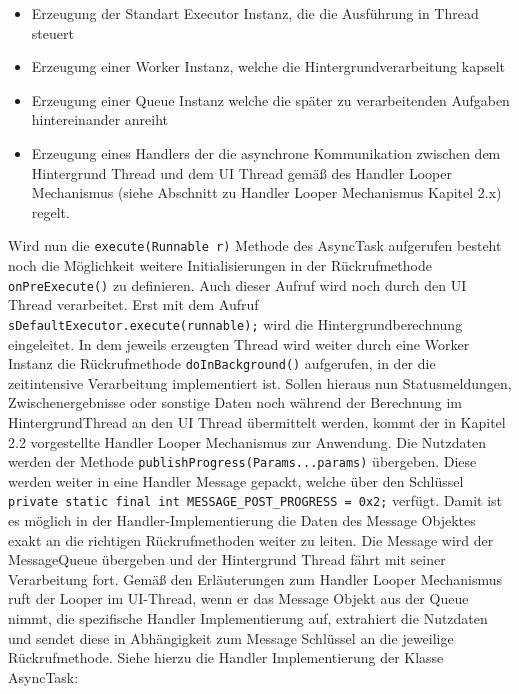 \documentclass[12pt,oneside,a4paper,bibtotoc,liststotoc]{scrreprt}
\begin{document}
\begin{itemize}
\item Erzeugung der Standart Executor Instanz, die die Ausführung in Thread steuert
\item Erzeugung einer Worker Instanz, welche die Hintergrundverarbeitung kapselt
\item Erzeugung einer Queue Instanz welche die später zu verarbeitenden Aufgaben hintereinander anreiht
\item Erzeugung eines Handlers der die asynchrone Kommunikation zwischen dem Hintergrund Thread und dem UI Thread gemäß des Handler Looper Mechanismus (siehe Abschnitt zu Handler Looper Mechanismus Kapitel 2.x) regelt.
\end{itemize}
Wird nun die \texttt{execute(Runnable r)} Methode des AsyncTask aufgerufen besteht noch die Möglichkeit weitere Initialisierungen in der Rückrufmethode \texttt{onPreExecute()} zu definieren. Auch dieser Aufruf wird noch durch den UI Thread verarbeitet. Erst mit dem Aufruf 
\texttt{sDefaultExecutor.execute(runnable);} wird die Hintergrundberechnung eingeleitet. In dem jeweils erzeugten Thread wird weiter durch eine Worker Instanz die Rückrufmethode \texttt{doInBackground()} aufgerufen, in der die zeitintensive Verarbeitung implementiert ist. Sollen hieraus nun Statusmeldungen, Zwischenergebnisse oder sonstige Daten noch während der Berechnung im HintergrundThread an den UI Thread übermittelt werden, kommt der in Kapitel 2.2 vorgestellte Handler Looper Mechanismus zur Anwendung. Die Nutzdaten werden der Methode \texttt{publishProgress(Params...params)} übergeben. Diese werden weiter in eine Handler Message gepackt, welche über den Schlüssel \newline
\texttt{private static final int MESSAGE\_POST\_PROGRESS = 0x2;}\newline
verfügt. Damit ist es möglich in der Handler-Implementierung die Daten des Message Objektes exakt an die richtigen Rückrufmethoden weiter zu leiten. Die Message wird der MessageQueue übergeben und der Hintergrund Thread fährt mit seiner Verarbeitung fort. Gemäß den Erläuterungen zum Handler Looper Mechanismus ruft der Looper im UI-Thread, wenn er das Message Objekt aus der Queue nimmt, die spezifische Handler Implementierung auf, extrahiert die Nutzdaten und sendet diese in Abhängigkeit zum Message Schlüssel an die jeweilige Rückrufmethode. Siehe hierzu die Handler Implementierung der Klasse AsyncTask:\newline
\end{document}
